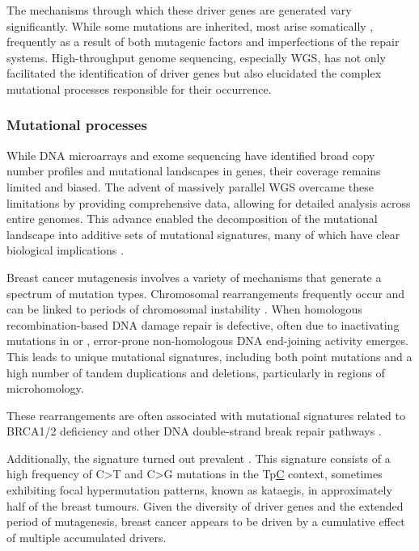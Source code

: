 The mechanisms through which these driver genes are generated vary significantly. While some mutations are inherited, most arise somatically , frequently as a result of both mutagenic factors and imperfections of the repair systems. High-throughput genome sequencing, especially \ac{WGS}, has not only facilitated the identification of driver genes but also elucidated the complex mutational processes responsible for their occurrence.

\subsubsection*{Mutational processes}

While DNA microarrays and exome sequencing have identified broad copy number profiles and mutational landscapes in genes, their coverage remains limited and biased. The advent of massively parallel \ac{WGS} overcame these limitations by providing comprehensive data, allowing for detailed analysis across entire genomes. This advance enabled the decomposition of the mutational landscape into additive sets of mutational signatures, many of which have clear biological implications \parencite{Nik-Zainal2012-vo}. 

Breast cancer mutagenesis involves a variety of mechanisms that generate a spectrum of mutation types. Chromosomal rearrangements frequently occur and can be linked to periods of chromosomal instability \parencite{Curtis2012-hu, Gerstung2020-sg, Nik-Zainal2012-vo}. When homologous recombination-based DNA damage repair is defective, often due to inactivating mutations in  or , error-prone non-homologous DNA end-joining activity emerges. This leads to unique mutational signatures, including both point mutations and a high number of tandem duplications and deletions, particularly in regions of microhomology.

These rearrangements are often associated with mutational signatures related to BRCA1/2 deficiency and other DNA double-strand break repair pathways \parencite{Nik-Zainal2012-vo}.


Additionally, the  signature turned out prevalent \parencite{Nik-Zainal2016-ek, Banerji2012-as, Nik-Zainal2012-vo}. This signature consists of a high frequency of C>T and C>G mutations in the Tp\underline{C} context, sometimes exhibiting focal hypermutation patterns, known as kataegis, in approximately half of the breast tumours. Given the diversity of driver genes and the extended period of mutagenesis, breast cancer appears to be driven by a cumulative effect of multiple accumulated drivers.

